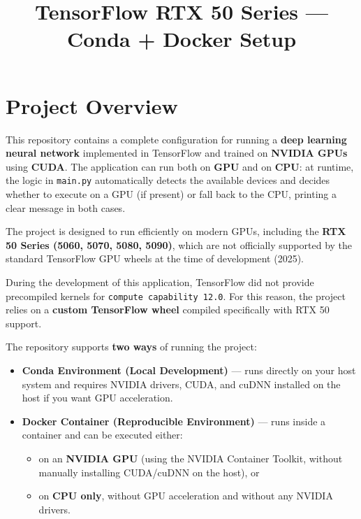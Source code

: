\documentclass[a4paper,11pt]{article}
\title{\textbf{TensorFlow RTX 50 Series --- Conda + Docker Setup}}
\author{}
\date{}
\begin{document}
\maketitle

\tableofcontents
\newpage

\section{Project Overview}

\noindent This repository contains a complete configuration for running a \textbf{deep learning neural network} implemented in TensorFlow and trained on \textbf{NVIDIA GPUs} using \textbf{CUDA}. The application can run both on \textbf{GPU} and on \textbf{CPU}: at runtime, the logic in \texttt{main.py} automatically detects the available devices and decides whether to execute on a GPU (if present) or fall back to the CPU, printing a clear message in both cases.

\vspace{0.7em}

\noindent The project is designed to run efficiently on modern GPUs, including the \textbf{RTX 50 Series (5060, 5070, 5080, 5090)}, which are not officially supported by the standard TensorFlow GPU wheels at the time of development (2025).

\vspace{0.7em}

\noindent During the development of this application, TensorFlow did not provide precompiled kernels for \texttt{compute capability 12.0}. For this reason, the project relies on a \textbf{custom TensorFlow wheel} compiled specifically with RTX 50 support.

\vspace{0.7em}

\noindent The repository supports \textbf{two ways} of running the project:

\begin{itemize}
    \item[\textbf{1.}] \textbf{Conda Environment (Local Development)} --- runs directly on your host system and requires NVIDIA drivers, CUDA, and cuDNN installed on the host if you want GPU acceleration.
    \item[\textbf{2.}] \textbf{Docker Container (Reproducible Environment)} --- runs inside a container and can be executed either:
    \begin{itemize}
        \item on an \textbf{NVIDIA GPU} (using the NVIDIA Container Toolkit, without manually installing CUDA/cuDNN on the host), or
        \item on \textbf{CPU only}, without GPU acceleration and without any NVIDIA drivers.
    \end{itemize}
\end{itemize}
\end{document}

